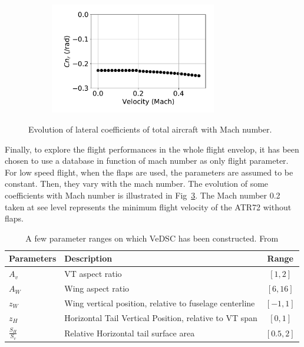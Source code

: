 \begin{figure}[hbt]
\begin{subfigure}[b]{0.49\textwidth}
		\caption{}
		\label{fig:CnbetaMachChange}
	\end{subfigure}
	\begin{subfigure}[b]{0.49\textwidth}
		\includegraphics[width=0.8\textwidth]{CnrMachChange}
		\caption{}
		\label{fig:CnrMachChange}
	\end{subfigure}
	\caption{Evolution of lateral coefficients of total aircraft with Mach number.}\label{fig:MachVariation}
\end{figure}

Finally, to explore the flight performances in the whole flight envelop, it has been chosen to use a database in function of mach number as only flight parameter. For low speed flight, when the flaps are used, the parameters are assumed to be constant. Then, they vary with the mach number. The evolution of some coefficients with Mach number is illustrated in Fig~\ref{fig:MachVariation}. The Mach number 0.2 taken at see level represents the minimum flight velocity of the ATR72 without flaps.


\begin{table}[hbt]
	\caption{\label{tab:VeDSCParam} A few parameter ranges on which VeDSC has been constructed. From \cite{NicolosiNewApproach}} 
	\centering
	\begin{tabular}{l|l|c}
		Parameters & Description & Range\\
		\hline
		$A_v$ & VT aspect ratio & $\left[1,2\right]$\\
		$A_W$ & Wing aspect ratio & $\left[6,16\right]$\\
		$z_W$ & Wing vertical position, relative to fuselage centerline & $\left[-1,1\right]$ \\
		$z_H$ & Horizontal Tail Vertical Position, relative to VT span & $\left[0,1\right]$\\
		$\frac{S_H}{S_v}$ & Relative Horizontal tail surface area & $\left[0.5,2\right]$
	\end{tabular}
\end{table}

